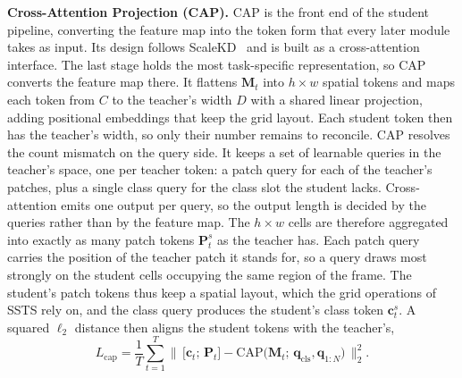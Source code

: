 \noindent\textbf{Cross-Attention Projection (CAP).}
CAP is the front end of the student pipeline, converting the feature map into the token form that
every later module takes as input.
Its design follows ScaleKD~\cite{fan2024scalekd} and is built as a cross-attention interface.
The last stage holds the most task-specific representation, so CAP converts the feature map there.
It flattens $\mathbf{M}_t$ into $h\times w$ spatial tokens and maps each token from $C$ to the
teacher's width $D$ with a shared linear projection, adding positional embeddings that keep the grid
layout.
Each student token then has the teacher's width, so only their number remains to reconcile.
CAP resolves the count mismatch on the query side.
It keeps a set of learnable queries in the teacher's space, one per teacher token:
a patch query for each of the teacher's patches, plus a single class query for the
class slot the student lacks.
Cross-attention emits one output per query, so the output length is decided by the queries rather
than by the feature map.
The $h\times w$ cells are therefore aggregated into exactly as many patch tokens $\mathbf{P}^{s}_t$
as the teacher has.
Each patch query carries the position of the teacher patch it stands for, so a query draws most
strongly on the student cells occupying the same region of the frame.
The student's patch tokens thus keep a spatial layout, which the grid operations of SSTS rely on,
and the class query produces the student's class token $\mathbf{c}^{s}_t$.
A squared $\ell_2$ distance then aligns the student tokens with the teacher's,
\begin{equation}
  L_\mathrm{cap} = \frac{1}{T}\sum_{t=1}^{T}
  \big\|\,\big[\mathbf{c}_t;\,\mathbf{P}_t\big]
  - \mathrm{CAP}\big(\mathbf{M}_t;\, \mathbf{q}_\mathrm{cls}, \mathbf{q}_{1:N}\big)\,\big\|_2^2 .
\end{equation}

